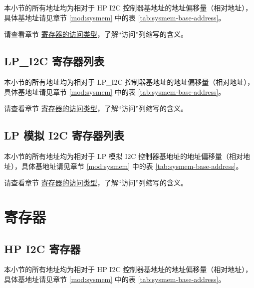 \documentclass[main\_\_CN.tex]{subfiles}
\begin{document}
本小节的所有地址均为相对于 HP I2C 控制器基地址的地址偏移量（相对地址），具体基地址请见章节 \ref{mod:sysmem} \textit{} 中的表 \ref{tab:sysmem-base-address}。

请查看章节 \hyperref[glossary-access-types]{寄存器的访问类型}，了解“访问”列缩写的含义。



\subsection{LP\_I2C 寄存器列表}
\label{sec:lp-i2c-ext-reg-summ}
\hypertarget{lp-i2c-ext-reg-summ}{}

本小节的所有地址均为相对于 LP\_I2C 控制器基地址的地址偏移量（相对地址），具体基地址请见章节 \ref{mod:sysmem} \textit{} 中的表 \ref{tab:sysmem-base-address}。

请查看章节 \hyperref[glossary-access-types]{寄存器的访问类型}，了解“访问”列缩写的含义。



\subsection{LP 模拟 I2C 寄存器列表}
\label{sec:lp-i2c-ana-reg-summ}
\hypertarget{lp-i2c-ana-reg-summ}{}

本小节的所有地址均为相对于 LP 模拟 I2C 控制器基地址的地址偏移量（相对地址），具体基地址请见章节 \ref{mod:sysmem} \textit{} 中的表 \ref{tab:sysmem-base-address}。

请查看章节 \hyperref[glossary-access-types]{寄存器的访问类型}，了解“访问”列缩写的含义。




\newpage
\section{寄存器}

\subsection{HP I2C 寄存器}

本小节的所有地址均为相对于 HP I2C 控制器基地址的地址偏移量（相对地址），具体基地址请见章节 \ref{mod:sysmem} \textit{} 中的表 \ref{tab:sysmem-base-address}。
\end{document}
